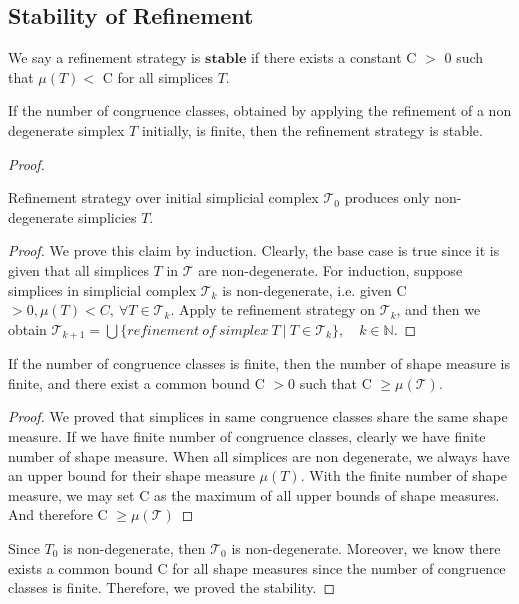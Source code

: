     \subsection{Stability of Refinement}
    \begin{definition*}
    We say a refinement strategy is $\textbf{stable}$ if there exists a constant C $>$ 0 such that $\mu(T)<$ C for all simplices $T$.
    \end{definition*}
    
    \begin{theorem*}
    If the number of congruence classes, obtained by applying the refinement of a non degenerate simplex $T$ initially, is finite, then the refinement strategy is stable.
    \end{theorem*}
    \begin{proof}
    \begin{claim*}
    Refinement strategy over initial simplicial complex $\mathcal{T_0}$ produces only non-degenerate simplicies $T$.
    \begin{proof}
    We prove this claim by induction.
    Clearly, the base case is true since it is given that all simplices $T$ in $\mathcal{T}$ are non-degenerate. For induction, suppose simplices in simplicial complex $\mathcal{T}_k$ is non-degenerate, i.e. given C $> 0, \mu(T) < C, ~\forall T \in\mathcal{T}_k$. Apply te refinement strategy on $\mathcal{T}_k$, and then we obtain $\mathcal{T}_{k+1} = \bigcup\{refinement~of~simplex~T ~\vert ~T\in\mathcal{T}_{k}\}, \quad k\in\mathbb{N}$. 
    \end{proof}
    \end{claim*}

    \begin{claim*}
    If the number of congruence classes is finite, then the number of shape measure is finite, and there exist a common bound C $> 0$ such that C $\geq \mu(\mathcal{T})$.
    \begin{proof}
    We proved that simplices in same congruence classes share the same shape measure. If we have finite number of congruence classes, clearly we have finite number of shape measure. When all simplices are non degenerate, we always have an upper bound for their shape measure $\mu(T)$. With the finite number of shape measure, we may set C as the maximum of all upper bounds of shape measures. And therefore C $\geq \mu(\mathcal{T})$
    \end{proof}
    \end{claim*}

    Since $T_0$ is non-degenerate, then $\mathcal{T_0}$ is non-degenerate. Moreover, we know there exists a common bound C for all shape measures since the number of congruence classes is finite. Therefore, we proved the stability.
    \end{proof}
    
